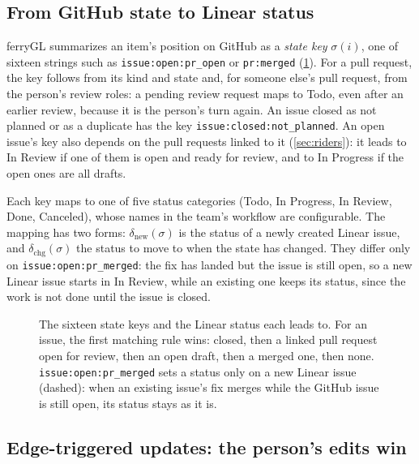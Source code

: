 \documentclass[11pt,a4paper]{article}
\newcommand{\ferry}{ferryGL}
\newcommand{\key}[1]{\texttt{#1}}
\newcommand{\status}[1]{\textsf{#1}}
\begin{document}
\subsection{From GitHub state to Linear status}
\label{sec:states}

\ferry{} summarizes an item's position on GitHub as a \emph{state key} $\sigma(i)$, one of
sixteen strings such as \key{issue:open:pr\_open} or \key{pr:merged} (\cref{fig:states}). For a
pull request, the key follows from its kind and state and, for someone else's pull request,
from the person's review roles: a pending review request maps to \status{Todo}, even after an
earlier review, because it is the person's turn again. An issue closed as not planned or as a
duplicate has the key \key{issue:closed:not\_planned}. An open issue's key also depends on the
pull requests linked to it (\cref{sec:riders}): it leads to \status{In Review} if one of them is
open and ready for review, and to \status{In Progress} if the open ones are all drafts.

Each key maps to one of five status categories (\status{Todo}, \status{In Progress},
\status{In Review}, \status{Done}, \status{Canceled}), whose names in the team's workflow are
configurable. The mapping has two forms: $\delta_{\text{new}}(\sigma)$ is the status of a newly
created Linear issue, and $\delta_{\text{chg}}(\sigma)$ the status to move to when the state has
changed. They differ only on \key{issue:open:pr\_merged}: the fix has landed but the issue is
still open, so a new Linear issue starts in \status{In Review}, while an existing one keeps its
status, since the work is not done until the issue is closed.

\begin{figure}[t]
  \centering
  
  \caption{The sixteen state keys and the Linear status each leads to. For an issue, the first
    matching rule wins: closed, then a linked pull request open for review, then an open draft,
    then a merged one, then none. \key{issue:open:pr\_merged} sets a status only on a new
    Linear issue (dashed): when an existing issue's fix merges while the GitHub issue is still
    open, its status stays as it is.}
  \label{fig:states}
\end{figure}

\subsection{Edge-triggered updates: the person's edits win}
\label{sec:edges}
\end{document}
